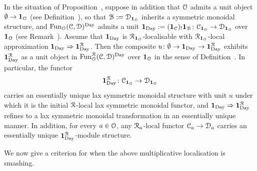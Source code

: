 \begin{corollary}
\label{corollary:multiplicative-day}%
In the situation of Proposition~, suppose in addition that $\mathcal{O}$ admits a unit object $\emptyset \to \mathbf{1}_{\mathcal{O}}$ (see Definition~), so that $\mathcal{B} := \mathcal{D}_{\mathbf{1}_{\mathcal{O}}}$ inherits a symmetric monoidal structure, and $\operatorname{Fun}_{\mathcal{O}}(\mathcal C,\mathcal{D})^{\mathrm{Day}}$ admits a unit $\mathbf{1}_{\mathrm{Day}} := (\mathbf{1}_\mathcal C)_!\mathbf{1}_{\mathcal{B}}\colon \mathcal C_{\mathbf{1}_{\mathcal{O}}} \to \mathcal{D}_{\mathbf{1}_{\mathcal{O}}}$ over $\mathbf{1}_{\mathcal{O}}$ (see Remark~). Assume that $\mathbf{1}_{\mathrm{Day}}$ is $\mathcal{R}_{\mathbf{1}_{\mathcal{O}}}$-localisable with $\mathcal{R}_{\mathbf{1}_{\mathcal{O}}}$-local approximation $\mathbf{1}_{\mathrm{Day}} \Rightarrow \mathbf{1}_{\mathrm{Day}}^{\mathcal{R}}$. Then the composite $u\colon \emptyset \to \mathbf{1}_{\mathrm{Day}} \to \mathbf{1}_{\mathrm{Day}}^{\mathcal{R}}$ exhibits $\mathbf{1}_{\mathrm{Day}}^{\mathcal{R}}$ as a unit object in $\operatorname{Fun}_{\mathcal{O}}^{\mathcal{R}}(\mathcal C,\mathcal{D})^{\mathrm{Day}}$ over $\mathbf{1}_{\mathcal{O}}$
in the sense of Definition~. In particular, 
the functor 
\[
\mathbf{1}_{\mathrm{Day}}^{\mathcal{R}}\colon \mathcal C_{\mathbf{1}_{\mathcal{O}}} \to \mathcal{D}_{\mathbf{1}_{\mathcal{O}}}
\]
carries an essentially unique lax symmetric monoidal structure with unit $u$ under which it is the initial $\mathcal{R}$-local lax symmetric monoidal functor, and $\mathbf{1}_{\mathrm{Day}} \Rightarrow \mathbf{1}_{\mathrm{Day}}^{\mathcal{R}}$ refines to a lax symmetric monoidal transformation in an essentially unique manner. In addition, for every $a \in \mathcal{O}$, any $\mathcal{R}_a$-local functor $\mathcal C_a \to \mathcal{D}_a$ carries an essentially unique $\mathbf{1}_{\mathrm{Day}}^{\mathcal{R}}$-module structure. 
\end{corollary}


We now give a criterion for when the above multiplicative localisation is smashing.



